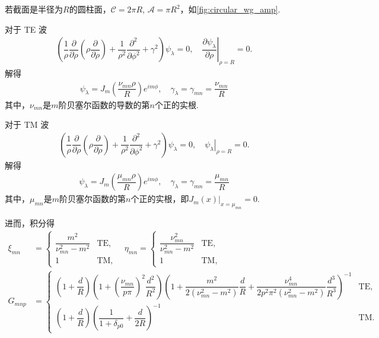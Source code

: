 \begin{exbox}
	若截面是半径为\(R\)的圆柱面，\(\mathcal{C} = 2\pi R\), \(\mathcal{A} = \pi R^2\)，如\cref{fig:circular_wg_amp}.

	对于 TE 波
	\begin{align*}
		\left( \dfrac{1}{\rho} \dfrac{\partial}{\partial \rho} \left( \rho \dfrac{\partial}{\partial \rho} \right) + \dfrac{1}{\rho^2} \dfrac{\partial^2}{\partial \phi^2} + \gamma^2 \right) \psi_\lambda = 0, \quad \left. \dfrac{\partial \psi_\lambda}{\partial \rho} \right|_{\rho=R} = 0.
	\end{align*}
	解得
	\begin{align*}
		\psi_\lambda = J_m \left( \dfrac{\nu_{mn} \rho}{R} \right) e^{im\phi}, \quad \gamma_\lambda = \gamma_{mn} = \dfrac{\nu_{mn}}{R}
	\end{align*}
	其中，\(\nu_{mn}\)是\(m\)阶贝塞尔函数的导数的第\(n\)个正的实根.

	对于 TM 波
	\begin{align*}
		\left( \dfrac{1}{\rho} \dfrac{\partial}{\partial \rho} \left( \rho \dfrac{\partial}{\partial \rho} \right) + \dfrac{1}{\rho^2} \dfrac{\partial^2}{\partial \phi^2} + \gamma^2 \right) \psi_\lambda = 0, \quad \left. \psi_\lambda \right|_{\rho=R} = 0.
	\end{align*}
	解得
	\begin{align*}
		\psi_\lambda = J_m \left( \dfrac{\mu_{mn} \rho}{R} \right) e^{im\phi}, \quad \gamma_\lambda = \gamma_{mn} = \dfrac{\mu_{mn}}{R}
	\end{align*}
	其中，\(\mu_{mn}\)是\(m\)阶贝塞尔函数的第\(n\)个正的实根，即\(\left. J_m(x) \right|_{x=\mu_{mn}} = 0.\)

	进而，积分得
	\begin{align*}
		\xi_{mn} &=
		\begin{cases}
			\dfrac{m^2}{\nu_{mn}^2 - m^2} & \text{TE}, \\[8pt]
			1                             & \text{TM},
		\end{cases}
		\quad
		\eta_{mn} =
		\begin{cases}
			\dfrac{\nu_{mn}^2}{\nu_{mn}^2 - m^2} & \text{TE}, \\[8pt]
			1                                    & \text{TM},
		\end{cases}\\
		G_{mnp} &=
		\begin{cases}
			\left( 1 + \dfrac{d}{R} \right) \left( 1 + \left( \dfrac{\nu_{mn}}{p\pi} \right)^2 \dfrac{d^2}{R^2} \right) \left( 1 + \dfrac{m^2}{2 \left( \nu_{mn}^2 - m^2 \right)} \dfrac{d}{R} + \dfrac{\nu_{mn}^4}{2 p^2 \pi^2 \left( \nu_{mn}^2 - m^2 \right)} \dfrac{d^3}{R^3} \right)^{-1} & \text{TE}, \\[10pt]
			\left( 1 + \dfrac{d}{R} \right) \left( \dfrac{1}{1 + \delta_{p0}} + \dfrac{d}{2R} \right)^{-1}                                                                                                                                                                                     & \text{TM}.
		\end{cases}
	\end{align*}
\end{exbox}


